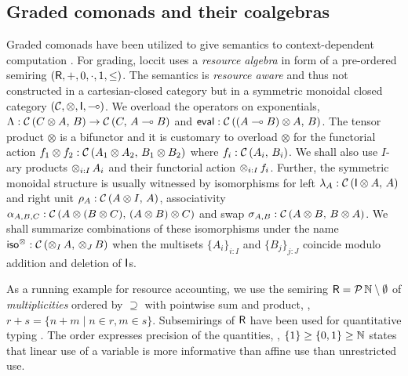 \documentclass[acmsmall,review,anonymous]{acmart}\settopmatter{printfolios=true,printccs=false,printacmref=false}
\begin{document}

\subsection{Graded comonads and their coalgebras}

Graded comonads have been utilized to give semantics to
context-dependent computation \citep{orchard:icfp14}.  For grading,
loccit uses a \emph{resource algebra} in form of a pre-ordered
semiring
$(\mathsf{R},{+},0,{\cdot},1,\leq)$.
%
The semantics is \emph{resource aware} and thus not constructed in a
cartesian-closed category but in a symmetric monoidal closed category
$(\mathcal{C},\otimes,\mathsf{I},\multimap)$.  We overload the operators on
exponentials, $\Lambda : \mathcal{C}\,(C \otimes A,\,B) \to \mathcal{C}\,(C,\,A \multimap B)$
and $\mathsf{eval} : \mathcal{C}\,((A \multimap B) \otimes A,\,B)$.  The tensor product
$\otimes$ is a bifunctor and it is customary to overload $\otimes$ for
the functorial action
$f_1 \otimes f_2 : \mathcal{C}\,(A_1 \otimes A_2,\,B_1 \otimes B_2)$ where
$f_i : \mathcal{C}\,(A_i,\,B_i)$.  We shall also use $I$-ary products
$\mathop\otimes_{i:I} A_i$ and their functorial action $\mathop\otimes_{i:I} f_i$.
Further, the symmetric monoidal structure is usually witnessed by
isomorphisms for left $\lambda_A : \mathcal{C}\,(\mathsf{I} \otimes A,\,A)$ and right
unit $\rho_A : \mathcal{C}\,(A \otimes I,\,A)$, associativity
$\alpha_{A,B,C} : \mathcal{C}\,(A \otimes (B \otimes C),\,(A \otimes B) \otimes
  C)$
and swap $\sigma_{A,B} : \mathcal{C}\,(A \otimes B,\,B \otimes A)$.  We shall
summarize combinations of these isomorphisms under the name
$\mathsf{iso}^\otimes : \mathcal{C}\,(\mathop\otimes_{I} A,\,\mathop\otimes_{J} B)$ when the multisets
$\{A_i\}_{i:I}$ and $\{B_j\}_{j:J}$ coincide modulo addition and
deletion of $\mathsf{I}$s.


As a running example for resource accounting,
we use the semiring $\mathsf{R} = \mathcal{P}\,\mathbb{N} \setminus \emptyset$ of
\emph{multiplicities} ordered by $\supseteq$ with pointwise sum and
product, \eg, $r + s = \{ n + m \mid n \in r, m \in s \}$.
Subsemirings of $\mathsf{R}$ have been used for quantitative typing
\cite{sergeyVytiniotisPeytonJones:popl14,mcBride:wadler60,atkey:lics08}.
The order expresses precision of the quantities, \eg,
$\{1\} \geq \{0,1\} \geq \mathbb{N}$ states that linear use of a variable is more informative than affine use than unrestricted use.
\end{document}
